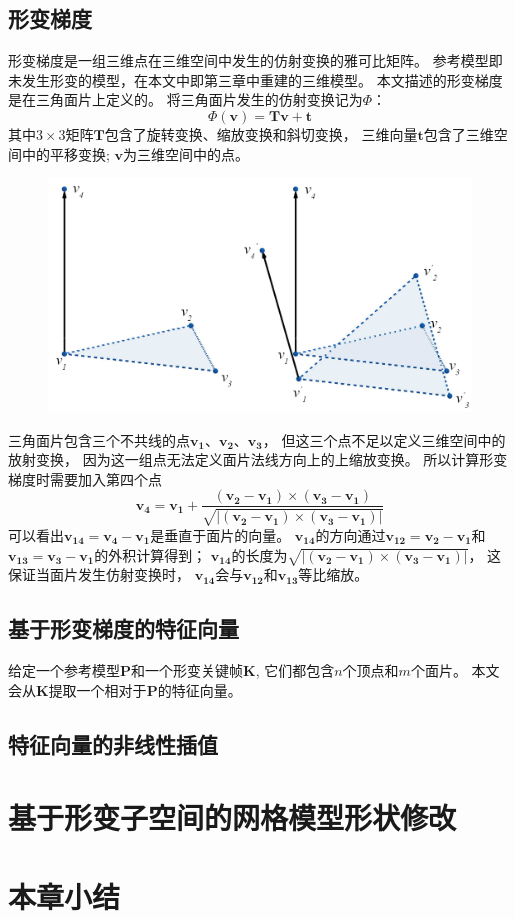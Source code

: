 \subsection{形变梯度}
形变梯度是一组三维点在三维空间中发生的仿射变换的雅可比矩阵。
参考模型即未发生形变的模型，在本文中即第三章中重建的三维模型。
本文描述的形变梯度是在三角面片上定义的。
将三角面片发生的仿射变换记为$\Phi$：
\begin{equation}
    \label{eq_at}
    \Phi(\bm{v})=\bm{T}\bm{v}+\bm{t}
\end{equation}
其中$3 \times 3$矩阵$\bm{T}$包含了旋转变换、缩放变换和斜切变换，
三维向量$\bm{t}$包含了三维空间中的平移变换;
$\bm{v}$为三维空间中的点。
\begin{figure}
    \centering
    \includegraphics[width = \textwidth]{./Pictures/DefGra.png}
    \caption{}
    \label{deformation_gradient}
\end{figure}
三角面片包含三个不共线的点$\bm{v_1}$、$\bm{v_2}$、$\bm{v_3}$，
但这三个点不足以定义三维空间中的放射变换，
因为这一组点无法定义面片法线方向上的上缩放变换。
所以计算形变梯度时需要加入第四个点
\begin{equation}
    \bm{v_4}=\bm{v_1}
    +
    \frac
        {(\bm{v_2}-\bm{v_1})\times(\bm{v_3}-\bm{v_1})}
        {\sqrt{|(\bm{v_2}-\bm{v_1})\times(\bm{v_3}-\bm{v_1})|}}
\end{equation}
可以看出$\bm{v_{14}}=\bm{v_4}-\bm{v_1}$是垂直于面片的向量。
$\bm{v_{14}}$的方向通过$\bm{v_{12}}=\bm{v_2}-\bm{v_1}$和
$\bm{v_{13}}=\bm{v_3}-\bm{v_1}$的外积计算得到；
$\bm{v_{14}}$的长度为$\sqrt{|(\bm{v_2}-\bm{v_1})\times(\bm{v_3}-\bm{v_1})|}$，
这保证当面片发生仿射变换时，
$\bm{v_{14}}$会与$\bm{v_{12}}$和$\bm{v_{13}}$等比缩放。


\subsection{基于形变梯度的特征向量}
给定一个参考模型$\bm{P}$和一个形变关键帧$\bm{K}$,
它们都包含$n$个顶点和$m$个面片。
本文会从$\bm{K}$提取一个相对于$\bm{P}$的特征向量。
\subsection{特征向量的非线性插值}
\section{基于形变子空间的网格模型形状修改}
\section{本章小结}